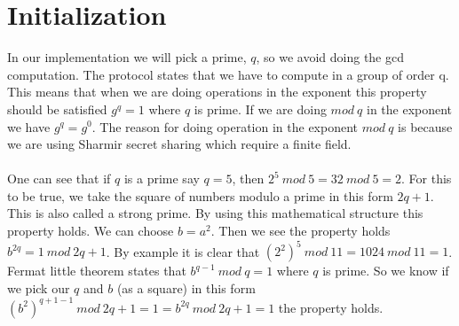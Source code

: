 \section{Initialization}
 In our implementation we will pick a prime, \begin{math}q\end{math}, so we avoid doing the gcd computation. The protocol states that we have to compute in a group of order q. This means that when we are doing operations in the exponent this property should be satisfied \begin{math}g^q=1\end{math} where \begin{math}q\end{math} is prime. If we are doing \begin{math}mod \ q \end{math} in the exponent we have \begin{math}g^q=g^0\end{math}. The reason for doing operation in the exponent \begin{math}mod \ q\end{math} is because we are using Sharmir secret sharing which require a finite field.\\\\
One can see that if \begin{math}q\end{math} is a prime say \begin{math}q=5\end{math}, then \begin{math}2^5 \ mod \ 5 = 32 \ mod \ 5 = 2\end{math}. For this to be true, we take the square of numbers modulo a prime in this form \begin{math}2q+1\end{math}. This is also called a strong prime. By using this mathematical structure this property holds. We can choose \begin{math}b=a^2\end{math}. Then we see the property holds \begin{math}b^{2q} = 1 \ mod \ 2q+1\end{math}. By example it is clear that \begin{math}(2^2)^5 \ mod \ 11 = 1024 \ mod \ 11 = 1\end{math}. Fermat little theorem states that \begin{math}b^{q-1} \ mod \ q = 1\end{math} where \begin{math}q\end{math} is prime. So we know if we pick our \begin{math}q\end{math} and \begin{math}b\end{math} (as a square)  in this form \begin{math}(b^{2})^{q+1-1} \ mod \ 2q+1 =1 =  b^{2q} \ mod \ 2q+1 =1\end{math} the property holds.


